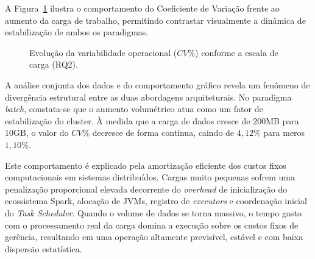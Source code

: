 A Figura~\ref{fig:rq2_variabilidade} ilustra o comportamento do Coeficiente de Variação frente ao aumento da carga de trabalho, permitindo contrastar visualmente a dinâmica de estabilização de ambos os paradigmas.

\begin{figure}[htbp]
\centering
{}
\caption{Evolução da variabilidade operacional ($CV\%$) conforme a escala de carga (RQ2).}
\label{fig:rq2_variabilidade}
\end{figure}

A análise conjunta dos dados e do comportamento gráfico revela um fenômeno de divergência estrutural entre as duas abordagens arquiteturais. No paradigma \textit{batch}, constata-se que o aumento volumétrico atua como um fator de estabilização do cluster. À medida que a carga de dados cresce de 200MB para 10GB, o valor do $CV\%$ decresce de forma contínua, caindo de $4{,}12\%$ para meros $1{,}10\%$. 

Este comportamento é explicado pela amortização eficiente dos custos fixos computacionais em sistemas distribuídos. Cargas muito pequenas sofrem uma penalização proporcional elevada decorrente do \textit{overhead} de inicialização do ecossistema Spark, alocação de JVMs, registro de \textit{executors} e coordenação inicial do \textit{Task Scheduler}. Quando o volume de dados se torna massivo, o tempo gasto com o processamento real da carga domina a execução sobre os custos fixos de gerência, resultando em uma operação altamente previsível, estável e com baixa dispersão estatística.

